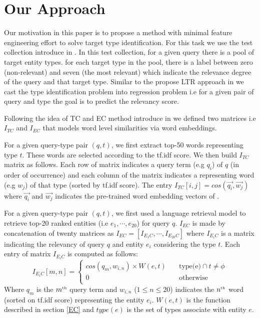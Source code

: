 \section{Our Approach}
Our motivation in this paper is to propose a method with minimal feature engineering effort to solve target type identification. For this task we use the test collection introduce in \cite{hasibiSig17}. In this test collection, for a given query there is a pool of target entity types. for each target type in the pool, there is a label between zero (non-relevant) and seven (the most relevant) which indicate the relevance degree of the query and that target type. Similar to the propose LTR approach in \cite{hasibiSig17} we cast the type identification problem into regression problem i.e for a given pair of query and type the goal is to predict the relevancy score.

Following the idea of TC and EC method introduce in \label{key} we defined two matrices i.e $I_{TC}$ and $I_{EC}$ that models word level similarities via word embeddings. 

 For a given query-type pair $(q,t)$, we first extract top-50 words representing type $t$. These words are selected according to the tf.idf score. We then build $I_{TC}$ matrix as follows. Each row of matrix indicates a query term (e.g $q_i$) of $q$ (in order of occurrence) and each column of the matrix indicates a representing word (e.g $w_j$) of that type (sorted by tf.idf score). The entry $I_{TC}[i,j] = cos(\vec{q_i}, \vec{w_j})$ where $\vec{q_i}$ and $\vec{w_j}$ indicates the pre-trained word embedding vectors of \cite{mikolovGoogle16Hasibi}.

 For a given query-type pair $(q,t)$, we first used a language retrieval model to retrieve top-20 ranked entities (i.e $e_1,\cdots, e_{20}$) for query $q$. $I_{EC}$ is made by concatenation of twenty matrices as $I_{EC} = [I_{E_1C},\cdots, I_{E_{20}C}]$ where $I_{E_iC}$ is a matrix indicating the relevancy of query $q$ and entity $e_i$ considering the type $t$. Each entry of matrix $I_{E_iC}$ is computed as follows:
\begin{equation}
I_{E_iC}[m,n] = 
\begin{cases}
cos(q_m,w_{i,n}) \times W(e,t) &\quad\text{type(e)} \cap t \neq \phi \\
0 &\quad\text{otherwise} \\
\end{cases}
\end{equation}
Where $q_m$ is the $m^{\text{\tiny th}}$ query term and $w_{i,n}$ ($1\leq n \leq20$) indicates the $n^{\text{\tiny th}}$ word (sorted on tf.idf score) representing the entity $e_i$. $W(e,t)$ is the function  described in section \ref{EC} and $type(e)$ is the set of types associate with entity $e$.


